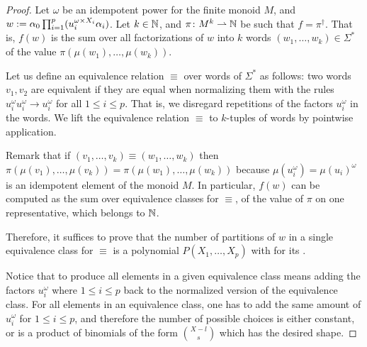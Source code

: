 \documentclass[sigconf,natbib=false,screen, review,anonymous]{acmart}
\begin{document}
\begin{proof}
    Let $\omega$ be an idempotent power for the finite monoid $M$,
    and
    $w \mathrel{:=} \alpha_0 \prod_{i = 1}^p (u_i^{\omega \times X_i} \alpha_i)$.
    Let $k \in \mathbb{N}$, and $\pi \colon M^k \rightharpoonup \mathbb{N}$ be such that
    $f = \pi^\dagger$. That is, 
    $f(w)$ is the sum over all factorizations of $w$
    into $k$ words $(w_1, \dots, w_k) \in \Sigma^*$
    of the value $\pi(\mu(w_1), \dots, \mu(w_k))$.

    Let us define an equivalence relation $\equiv$ over words of
    $\Sigma^*$ as follows: two words $v_1, v_2$ are equivalent if they are
    equal when normalizing them with the rules $u_i^{\omega} u_i^{\omega} \to
    u_i^{\omega}$ for all $1 \leq i \leq p$. That is, we disregard
    repetitions of the factors $u_i^{\omega}$ in the words.
    We lift the equivalence relation $\equiv$ to $k$-tuples of
    words by pointwise application.

    Remark that if $(v_1, \dots, v_k) \equiv (w_1, \dots, w_k)$ then
    $\pi(\mu(v_1), \dots, \mu(v_k)) = \pi(\mu(w_1), \dots, \mu(w_k))$ because
    $\mu(u_i^\omega) = \mu(u_i)^\omega$ is an idempotent element of the monoid
    $M$. In particular, $f(w)$ can be computed as the sum over equivalence
    classes for $\equiv$, of the value of $\pi$ on one representative,
    which belongs to $\mathbb{N}$.

    Therefore, it suffices to prove that the number of partitions of $w$ in a
    single equivalence class for $\equiv$ is a polynomial $P(X_1, \dots, X_p)$
    with  for its .

    Notice that to produce all elements in a given equivalence class
    means adding the factors $u_i^\omega$ where $1 \leq i \leq p$
    back to the normalized version
    of the equivalence class. For all elements in an equivalence class,
    one has to add the same amount of $u_i^\omega$ for $1 \leq i \leq p$,
    and therefore the number of possible choices
    is either constant, or 
    is a product of binomials of the form $\binom{X - l}{s}$
    which has the desired shape.
\end{proof}
\end{document}
